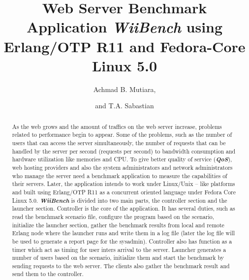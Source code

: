 \documentclass[final,
notitlepage,
narroweqnarray,
    inline,
    twoside,
]{ieee}
\begin{document}
\title[Web Server Benchmark Application]{Web Server Benchmark Application \textit{WiiBench} using Erlang/OTP R11 and Fedora-Core Linux 5.0}

\author[MUTIARA AND SABASTIAN]{Achmad B. Mutiara,\and{}and T.A. Sabastian  }






\maketitle

\begin{abstract}
As the web grows and the amount of traffics on the web server
increase, problems related to performance begin to appear. Some of
the problems, such as the number of users that can access the
server simultaneously, the number of requests that can be handled
by the server per second (requests per second) to bandwidth
consumption and hardware utilization like memories and CPU. To
give better quality of service (\textbf{\textit{QoS}}), web
hosting providers and also the system administrators and network
administrators who manage the server need a benchmark application
to measure the capabilities of their servers. Later, the
application intends to work under Linux/Unix -- like platforms and
built using Erlang/OTP R11 as a concurrent oriented language under
Fedora Core Linux 5.0. \textbf{\textit{WiiBench}} is divided into
two main parts, the controller section and the launcher section.
Controller is the core of the application. It has several duties,
such as read the benchmark scenario file, configure the program
based on the scenario, initialize the launcher section, gather the
benchmark results from local and remote Erlang node where the
launcher runs and write them in a log file (later the log file
will be used to generate a report page for the sysadmin).
Controller also has function as a timer which act as timing for
user inters arrival to the server. Launcher generates a number of
users based on the scenario, initialize them and start the
benchmark by sending requests to the web server. The clients also
gather the benchmark result and send them to the controller.


\end{abstract}
\end{document}
